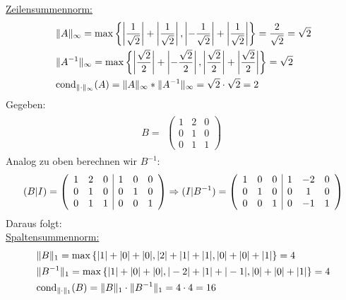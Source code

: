 \underline{Zeilensummennorm:}
\begin{align*}
\begin{split}
&\|A\|_\infty =\mathrm{max}\left\lbrace\left|\frac{1}{\sqrt2}\right|+\left|\frac{1}{\sqrt2}\right|, \left|-\frac{1}{\sqrt2}\right|+\left|\frac{1}{\sqrt2}\right|\right\rbrace= \frac{2}{\sqrt{2}} = \sqrt{2}\\
&\|A^{-1}\|_\infty=\mathrm{max}\left\lbrace\left|\frac{\sqrt2}{2}\right|+\left|-\frac{\sqrt2}{2}\right|, \left|\frac{\sqrt2}{2}\right|+\left|\frac{\sqrt2}{2}\right|\right\rbrace={\sqrt2}\\
& \mathrm{cond}_{\| \cdot \|_\infty}(A)=\|A\|_\infty*\|A^{-1}\|_\infty=  {\sqrt{2}} \cdot  {\sqrt{2}}  = 2 \\
\end{split}
\end{align*}
\newline
Gegeben:\\
\begin{align*}
B=
\begin{split}
\begin{pmatrix}
1 & 2 & 0 \\
0 & 1 & 0 \\
0 & 1 & 1
\end{pmatrix}
\end{split}
\end{align*}
Analog zu oben berechnen wir $B^{-1}$:\\
\begin{align*}
(B|I)=
\begin{split}
\begin{array}({ccc|ccc})
1 & 2 & 0 & 1 & 0 & 0\\
0 & 1 & 0 & 0 & 1 & 0\\
0 & 1 & 1 & 0 & 0 & 1
\end{array}
\Rightarrow(I|B^{-1})=
\begin{array}({ccc|ccc})
1 & 0 & 0 &1 & -2 & 0 \\
0 & 1 & 0 &0 & 1 & 0 \\
0 & 0 & 1 &0 & -1 & 1
\end{array}
\end{split}
\end{align*}
Daraus folgt:\\
\underline{Spaltensummennorm:}
\begin{align*}
\begin{split}
&\|B\|_1=\mathrm{max} \left\lbrace|1|+|0|+|0|, |2|+|1|+|1|, |0|+|0|+|1|\right\rbrace = 4\\
&\|B^{-1}\|_1=\mathrm{max} \left\lbrace|1|+|0|+|0|, |-2|+|1|+|-1|, |0|+|0|+|1|\right\rbrace = 4\\
&\mathrm{cond}_{\| \cdot \|_1}(B)=\|B\|_1\cdot\|B^{-1}\|_1= 4 \cdot 4 = 16\\
\end{split}
\end{align*}
